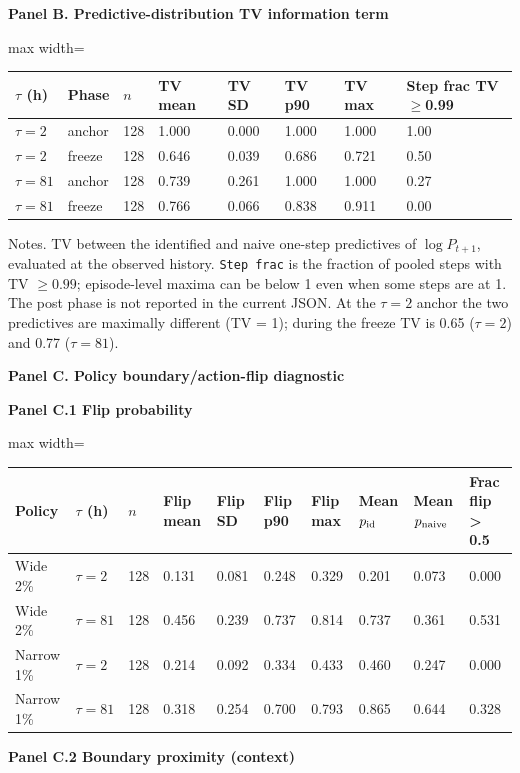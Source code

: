 \begin{table}[!htbp]
\par\textbf{Panel B. Predictive-distribution TV information term}

\begin{adjustbox}{max width=\linewidth}
\begin{tabular}{@{}llllllll@{}}
\toprule
$\tau$ (h) & Phase & $n$ & TV mean & TV SD & TV p90 & TV max & Step frac TV$\ge$0.99 \\
\midrule
$\tau=2$ & anchor & 128 & 1.000 & 0.000 & 1.000 & 1.000 & 1.00 \\
$\tau=2$ & freeze & 128 & 0.646 & 0.039 & 0.686 & 0.721 & 0.50 \\
$\tau=81$ & anchor & 128 & 0.739 & 0.261 & 1.000 & 1.000 & 0.27 \\
$\tau=81$ & freeze & 128 & 0.766 & 0.066 & 0.838 & 0.911 & 0.00 \\
\bottomrule
\end{tabular}
\end{adjustbox}
\vspace{0.5em}
\par\noindent\begin{minipage}{\linewidth}\raggedright{\scriptsize Notes. TV between the identified and naive one-step predictives of $\log P_{t+1}$, evaluated at the observed history. \texttt{Step frac} is the fraction of pooled steps with TV $\ge 0.99$; episode-level maxima can be below 1 even when some steps are at 1. The post phase is not reported in the current JSON. At the $\tau=2$ anchor the two predictives are maximally different (TV = 1); during the freeze TV is 0.65 ($\tau=2$) and 0.77 ($\tau=81$).}\end{minipage}\par

\par\textbf{Panel C. Policy boundary/action-flip diagnostic}

\par\textbf{Panel C.1 Flip probability}

\begin{adjustbox}{max width=\linewidth}
\begin{tabular}{@{}llllllllll@{}}
\toprule
Policy & $\tau$ (h) & $n$ & Flip mean & Flip SD & Flip p90 & Flip max & Mean $p_{\rm id}$ & Mean $p_{\rm naive}$ & Frac flip \textgreater{} 0.5 \\
\midrule
Wide 2\% & $\tau=2$ & 128 & 0.131 & 0.081 & 0.248 & 0.329 & 0.201 & 0.073 & 0.000 \\
Wide 2\% & $\tau=81$ & 128 & 0.456 & 0.239 & 0.737 & 0.814 & 0.737 & 0.361 & 0.531 \\
Narrow 1\% & $\tau=2$ & 128 & 0.214 & 0.092 & 0.334 & 0.433 & 0.460 & 0.247 & 0.000 \\
Narrow 1\% & $\tau=81$ & 128 & 0.318 & 0.254 & 0.700 & 0.793 & 0.865 & 0.644 & 0.328 \\
\bottomrule
\end{tabular}
\end{adjustbox}
\vspace{0.5em}
\par\textbf{Panel C.2 Boundary proximity (context)}


\end{table}

